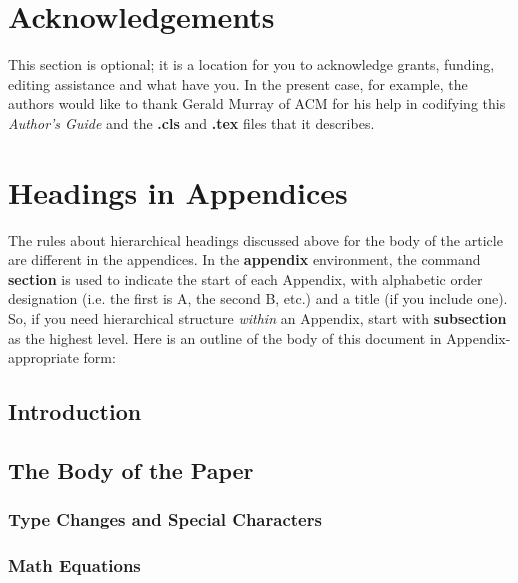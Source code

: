 \documentclass{sigkddExp}
\begin{document}
\section{Acknowledgements}
This section is optional; it is a location for you
to acknowledge grants, funding, editing assistance and
what have you.  In the present case, for example, the
authors would like to thank Gerald Murray of ACM for
his help in codifying this \textit{Author's Guide}
and the \textbf{.cls} and \textbf{.tex} files that it describes.

%

%
%
\appendix
\section{Headings in Appendices}
The rules about hierarchical headings discussed above for
the body of the article are different in the appendices.
In the \textbf{appendix} environment, the command
\textbf{section} is used to
indicate the start of each Appendix, with alphabetic order
designation (i.e. the first is A, the second B, etc.) and
a title (if you include one).  So, if you need
hierarchical structure
\textit{within} an Appendix, start with \textbf{subsection} as the
highest level. Here is an outline of the body of this
document in Appendix-appropriate form:
\subsection{Introduction}
\subsection{The Body of the Paper}
\subsubsection{Type Changes and Special Characters}
\subsubsection{Math Equations}
\end{document}
